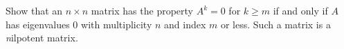 \item [3.20] Show that an $n \times n$ matrix has the property $A^k = 0$ for $k \geq m$ if and only if $A$ has eigenvalues 0 with multiplicity $n$ and index $m$ or less.
Such a matrix is a \emph nilpotent matrix.
